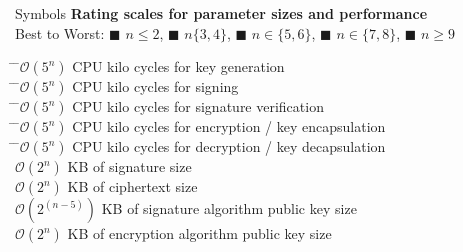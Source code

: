 \begin{minipage}[t]{0.4\textwidth}
\begin{algorithmbox}{Symbols}
        {\bfseries Rating scales for parameter sizes and performance}\\[0.5\baselineskip]
        Best to Worst: \textcolor{themegreen}{$\blacksquare$} $n\leq2$, \textcolor{themeyellow}{$\blacksquare$} $n\{3,4\}$, \textcolor{themeorange}{$\blacksquare$} $n\in\{5,6\}$, \textcolor{themered}{$\blacksquare$} $n\in\{7,8\}$, \textcolor{themered!65!black}{$\blacksquare$} $n\geq9$
        \begin{tabbing}
            \=
            \=$\mathcal{O}(5^n)$ CPU kilo cycles for key generation\\
            \=
            \=$\mathcal{O}(5^n)$ CPU kilo cycles for signing\\
            \=
            \=$\mathcal{O}(5^n)$ CPU kilo cycles for signature verification\\
            \=
            \=$\mathcal{O}(5^n)$ CPU kilo cycles for encryption / key encapsulation\\
            \=
            \=$\mathcal{O}(5^n)$ CPU kilo cycles for decryption / key decapsulation\\
            \>
            \>$\mathcal{O}(2^n)$ KB of signature size\\
            \>
            \> $\mathcal{O}(2^n)$ KB of ciphertext size\\
            \>
            \> $\mathcal{O}(2^{(n-5)})$ KB of signature algorithm public key size\\
            \>
            \> $\mathcal{O}(2^n)$ KB of encryption algorithm public key size\\
        \end{tabbing}
        \vspace{-6.6mm}
    \end{algorithmbox}
\end{minipage}
\hfill
